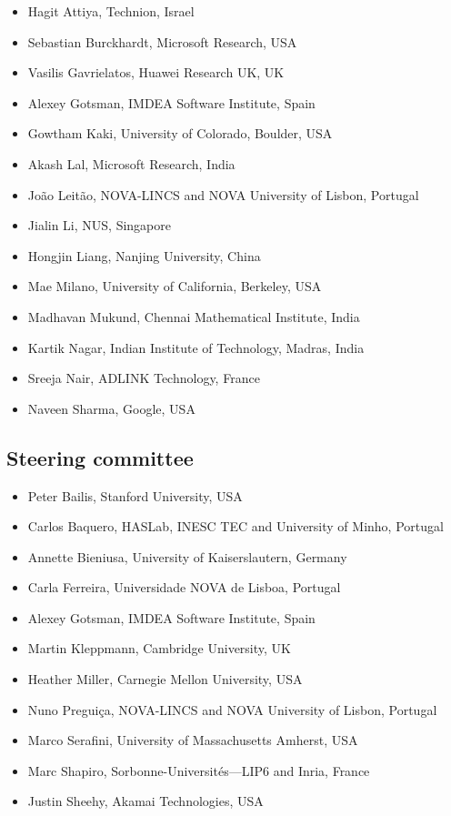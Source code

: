 \documentclass[screen,11pt]{acmart}
\begin{document}
\begin{itemize}

\item Hagit Attiya, Technion, Israel
\item Sebastian Burckhardt, Microsoft Research, USA
\item Vasilis Gavrielatos, Huawei Research UK, UK
\item Alexey Gotsman, IMDEA Software Institute, Spain
\item Gowtham Kaki, University of Colorado, Boulder, USA
\item Akash Lal, Microsoft Research, India
\item João Leitão, NOVA-LINCS and NOVA University of Lisbon, Portugal
\item Jialin Li, NUS, Singapore
\item Hongjin Liang, Nanjing University, China
\item Mae Milano, University of California, Berkeley, USA
\item Madhavan Mukund, Chennai Mathematical Institute, India
\item Kartik Nagar, Indian Institute of Technology, Madras, India
\item Sreeja Nair, ADLINK Technology, France
\item Naveen Sharma, Google, USA

\end{itemize}

\subsection*{Steering committee}

\begin{itemize}
\item Peter Bailis, Stanford University, USA
\item Carlos Baquero, HASLab, INESC TEC and University of Minho, Portugal
\item Annette Bieniusa, University of Kaiserslautern, Germany
\item Carla Ferreira, Universidade NOVA de Lisboa, Portugal
\item Alexey Gotsman, IMDEA Software Institute, Spain
\item Martin Kleppmann, Cambridge University, UK
\item Heather Miller, Carnegie Mellon University, USA
\item Nuno Preguiça, NOVA-LINCS and NOVA University of Lisbon, Portugal
\item Marco Serafini, University of Massachusetts Amherst, USA
\item Marc Shapiro, Sorbonne-Universités—LIP6 and Inria, France
\item Justin Sheehy, Akamai Technologies, USA
\end{itemize}
\end{document}
